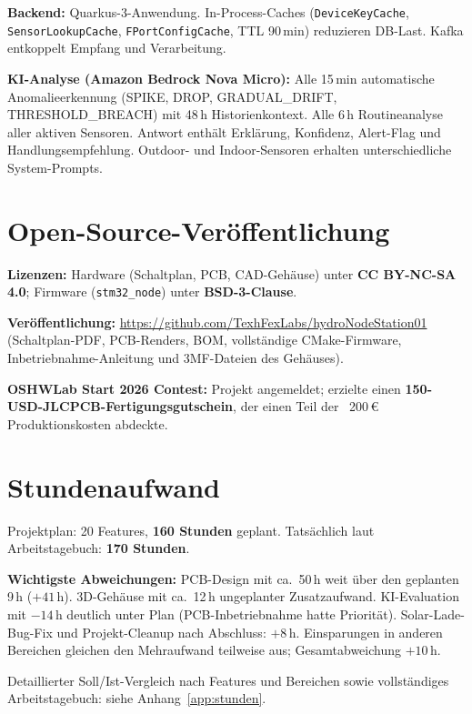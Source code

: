 \documentclass[11pt,a4paper]{scrartcl}
\begin{document}
\textbf{Backend:} Quarkus-3-Anwendung. In-Process-Caches (\texttt{DeviceKeyCache}, \texttt{SensorLookupCache}, \texttt{FPortConfigCache}, TTL 90\,min) reduzieren DB-Last. Kafka entkoppelt Empfang und Verarbeitung.

\textbf{KI-Analyse (Amazon Bedrock Nova Micro):} Alle 15\,min automatische Anomalieerkennung (SPIKE, DROP, GRADUAL\_DRIFT, THRESHOLD\_BREACH) mit 48\,h Historienkontext. Alle 6\,h Routineanalyse aller aktiven Sensoren. Antwort enthält Erklärung, Konfidenz, Alert-Flag und Handlungsempfehlung. Outdoor- und Indoor-Sensoren erhalten unterschiedliche System-Prompts.

\section{Open-Source-Veröffentlichung}

\textbf{Lizenzen:} Hardware (Schaltplan, PCB, CAD-Gehäuse) unter \textbf{CC BY-NC-SA 4.0}; Firmware (\texttt{stm32\_node}) unter \textbf{BSD-3-Clause}.

\textbf{Veröffentlichung:} \url{https://github.com/TexhFexLabs/hydroNodeStation01} (Schaltplan-PDF, PCB-Renders, BOM, vollständige CMake-Firmware, Inbetriebnahme-Anleitung und 3MF-Dateien des Gehäuses).

\textbf{OSHWLab Start 2026 Contest:} Projekt angemeldet; erzielte einen \textbf{150-USD-JLCPCB-Fertigungsgutschein}, der einen Teil der ~200\,€ Produktionskosten abdeckte.

\section{Stundenaufwand}

Projektplan: 20 Features, \textbf{160 Stunden} geplant. Tatsächlich laut Arbeitstagebuch: \textbf{170 Stunden}.

\textbf{Wichtigste Abweichungen:} PCB-Design mit ca.~50\,h weit über den geplanten 9\,h ($+41\,\text{h}$). 3D-Gehäuse mit ca.~12\,h ungeplanter Zusatzaufwand. KI-Evaluation mit $-14\,\text{h}$ deutlich unter Plan (PCB-Inbetriebnahme hatte Priorität). Solar-Lade-Bug-Fix und Projekt-Cleanup nach Abschluss: $+8\,\text{h}$. Einsparungen in anderen Bereichen gleichen den Mehraufwand teilweise aus; Gesamtabweichung $+10\,\text{h}$.

Detaillierter Soll/Ist-Vergleich nach Features und Bereichen sowie vollständiges Arbeitstagebuch: siehe Anhang~\ref{app:stunden}.
\end{document}

